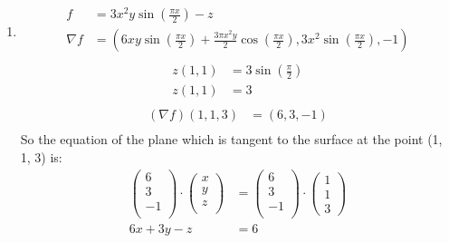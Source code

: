 \documentclass[10pt,\jkfside,a4paper]{article}
\begin{document}
\begin{enumerate}
\item
\begin{equation}
\begin{split}
f &= 3x^2y\sin\left(\frac{\pi x}{2}\right) - z \\
\nabla f &= \left(6xy\sin\left(\frac{\pi x}{2}\right) + \frac{3\pi x^2y}{2}\cos\left(\frac{\pi x}{2}\right), 3x^2\sin\left(\frac{\pi x}{2}\right), -1 \right) \\
\end{split}
\end{equation}
\begin{equation}
\begin{split}
z(1, 1) &= 3\sin\left(\frac{\pi}{2}\right) \\
z(1, 1) &= 3 \\
\end{split}
\end{equation}
\begin{equation}
\begin{split}
(\nabla f)(1, 1, 3) &= \left(6, 3, -1 \right) \\
\end{split}
\end{equation}
So the equation of the plane which is tangent to the surface at the point (1, 1, 3) is:
\begin{equation}
\begin{split}
\begin{pmatrix} 6 \\ 3 \\ -1 \\ \end{pmatrix} \cdot \begin{pmatrix} x \\ y \\ z \\ \end{pmatrix} &= \begin{pmatrix} 6 \\ 3 \\ -1 \\ \end{pmatrix} \cdot \begin{pmatrix} 1 \\ 1 \\ 3 \end{pmatrix} \\
6x + 3y - z &= 6 \\
\end{split}
\end{equation}


\end{enumerate}
\end{document}
